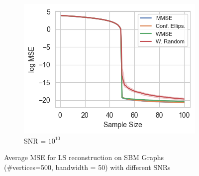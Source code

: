 \begin{figure}
    \begin{subfigure}{0.3\columnwidth}
    \includegraphics[width=\columnwidth]{figures/proj1/plots/LS_MSE/SBM_500_bandwidth_50_SNRdbs_100.0_samps_100_MSE_LS.png}%
    \caption{SNR = $10^{10}$}%
    \label{SBM_MSE_subfigc}%
    \end{subfigure}%
    \caption{Average MSE for LS reconstruction on SBM Graphs (\#vertices=500, bandwidth = 50) with different SNRs}
\label{LS_SBM_MSE_fig}
\end{figure}

